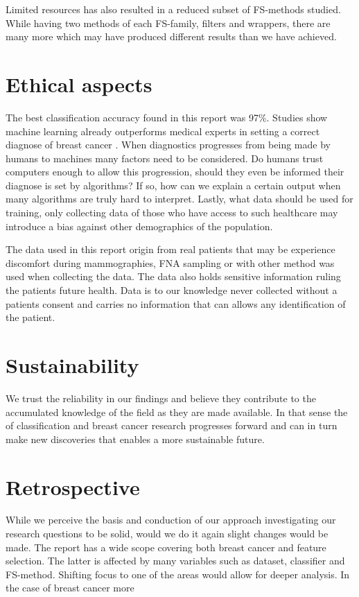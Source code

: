 Limited resources has also resulted in a reduced subset of FS-methods studied. While having two methods of each FS-family, filters and wrappers, there are many more which may have produced different results than we have achieved.


\section{Ethical aspects}

The best classification accuracy found in this report was 97\%. Studies show machine learning already outperforms medical experts in setting a correct diagnose of breast cancer \parencite{fnab}. When diagnostics progresses from being made by humans to machines many factors need to be considered. Do humans trust computers enough to allow this progression, should they even be informed their diagnose is set by algorithms? If so, how can we explain a certain output when many algorithms are truly hard to interpret. Lastly, what data should be used for training, only collecting data of those who have access to such healthcare may introduce a bias against other demographics of the population.

The data used in this report origin from real patients that may be experience discomfort during mammographies, FNA sampling or with other method was used when collecting the data. The data also holds sensitive information ruling the patients future health. Data is to our knowledge never collected without a patients consent and carries no information that can allows any identification of the patient.

\section{Sustainability}

We trust the reliability in our findings and believe they contribute to the accumulated knowledge of the field as they are made available. In that sense the of classification and breast cancer research progresses forward and can in turn make new discoveries that enables a more sustainable future.

\section{Retrospective}

While we perceive the basis and conduction of our approach investigating our research questions to be solid, would we do it again slight changes would be made. The report has a wide scope covering both breast cancer and feature selection. The latter is affected by many variables such as dataset, classifier and FS-method. Shifting focus to one of the areas would allow for deeper analysis. In the case of breast cancer more
